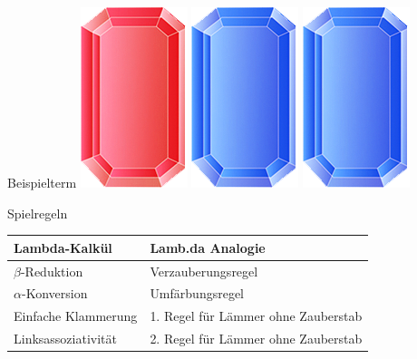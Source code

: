 \documentclass[18pt]{beamer}
\begin{document}
\begin{frame}{Beispielterm}
	\hspace{0.5cm} \includegraphics[scale=0.5]{pictures/gem_red} \hspace{0.05cm} \hspace{1.7cm} \includegraphics[scale=0.5]{pictures/gem_blue} \hspace{0.05cm} \includegraphics[scale=0.5]{pictures/gem_blue} \\
\end{frame}

\begin{frame}{Spielregeln}
	\centering
	\begin{tabular}[h]{l | l}
	Lambda-Kalkül & Lamb.da Analogie \\
	\hline
	$\beta$-Reduktion & Verzauberungsregel \\
	$\alpha$-Konversion & Umfärbungsregel \\
	Einfache Klammerung & 1. Regel für Lämmer ohne Zauberstab \\
	Linksassoziativität & 2. Regel für Lämmer ohne Zauberstab
	\end{tabular}
\end{frame}
\end{document}
